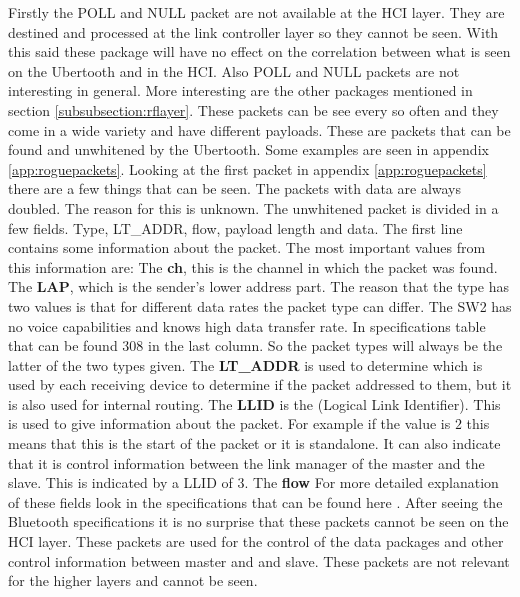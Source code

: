 Firstly the POLL and NULL packet are not available at the HCI layer. They are destined and processed at the link controller layer so they cannot be seen. With this said these package will have no effect on the correlation between what is seen on the Ubertooth and in the HCI. Also POLL and NULL packets are not interesting in general. More interesting are the other packages mentioned in section \ref{subsubsection:rflayer}. These packets can be see every so often and they come in a wide variety and have different payloads.
These are packets that can be found and unwhitened by the Ubertooth.
Some examples are seen in appendix \ref{app:roguepackets}.
Looking at the first packet in appendix \ref{app:roguepackets} there are a few things that can be seen. The packets with data are always doubled. The reason for this is unknown. The unwhitened packet is divided in a few fields. Type, LT\_ADDR, flow, payload length and data. The first line contains some information about the packet. The most important values from this information are:
The \textbf{ch}, this is the channel in which the packet was found.
The \textbf{LAP}, which is the sender's lower address part.
The reason that the type has two values is that for different data rates the packet type can differ. The SW2 has no voice capabilities and knows high data transfer rate. In specifications table that can be found 308 in the last column. So the packet types will always be the latter of the two types given.
The \textbf{LT\_ADDR} is used to determine which is used by each receiving device to determine if the packet addressed to them, but it is also used for internal routing.
The \textbf{LLID} is the (Logical Link Identifier). This is used to give information about the packet. For example if the value is $2$ this means that this is the start of the packet or it is standalone. It can also indicate that it is control information between the link manager of the master and the slave. This is indicated by a LLID of $3$.
The \textbf{flow}
For more detailed explanation of these fields look in the specifications that can be found here \cite{bt3.0}.
After seeing the Bluetooth specifications it is no surprise that these packets cannot be seen on the HCI layer. These packets are used for the control of the data packages and other control information between master and and slave. These packets are not relevant for the higher layers and cannot be seen.
